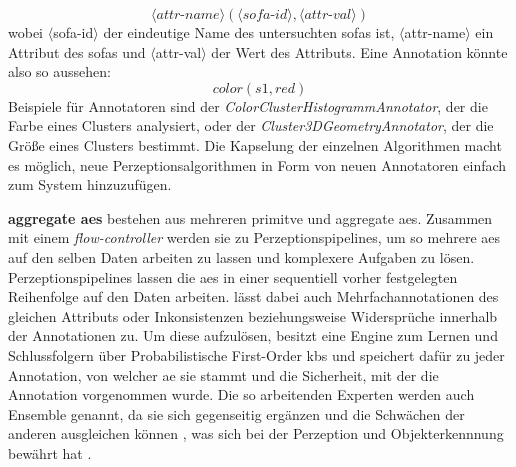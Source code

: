 \begin{displaymath}
\langle attr\text{-}name \rangle (\langle sofa\text{-}id \rangle , \langle attr\text{-}val \rangle)
\end{displaymath}
wobei $\langle$sofa-id$\rangle$ der eindeutige Name des untersuchten \glspl{sofa} ist, $\langle$attr-name$\rangle$ ein Attribut des \glspl{sofa} und $\langle$attr-val$\rangle$ der Wert des Attributs. Eine Annotation könnte also so aussehen: 
\begin{displaymath}
color(s1, red)
\end{displaymath}
Beispiele für Annotatoren sind der \textit{ColorClusterHistogrammAnnotator}, der die Farbe eines Clusters analysiert, oder der \textit{Cluster3DGeometryAnnotator}, der die Größe eines Clusters bestimmt. Die Kapselung der einzelnen Algorithmen macht es möglich, neue Perzeptionsalgorithmen in Form von neuen Annotatoren einfach zum System hinzuzufügen. \par

\textbf{aggregate \glspl{ae}} bestehen aus mehreren primitve und aggregate \glspl{ae}. Zusammen mit einem \textit{flow-controller} werden sie zu Perzeptionspipelines, um so mehrere \glspl{ae} auf den selben Daten arbeiten zu lassen und komplexere Aufgaben zu lösen. Perzeptionspipelines lassen die \glspl{ae} in einer sequentiell vorher festgelegten Reihenfolge auf den Daten arbeiten. \robosherlock lässt dabei auch Mehrfachannotationen des gleichen Attributs oder Inkonsistenzen beziehungsweise Widersprüche innerhalb der Annotationen zu. Um diese aufzulösen, besitzt \robosherlock eine Engine zum Lernen und Schlussfolgern über Probabilistische First-Order \glspl{kb} und speichert dafür zu jeder Annotation, von welcher \gls{ae} sie stammt und die Sicherheit, mit der die Annotation vorgenommen wurde. Die so arbeitenden Experten werden auch Ensemble genannt, da sie sich gegenseitig ergänzen und die Schwächen der anderen ausgleichen können \cite{polikar}, was sich bei der Perzeption und Objekterkennnung bewährt hat \cite{multimodalTemplate, atrBasedObjIden, pronobis1, pr2looking}.  
  
